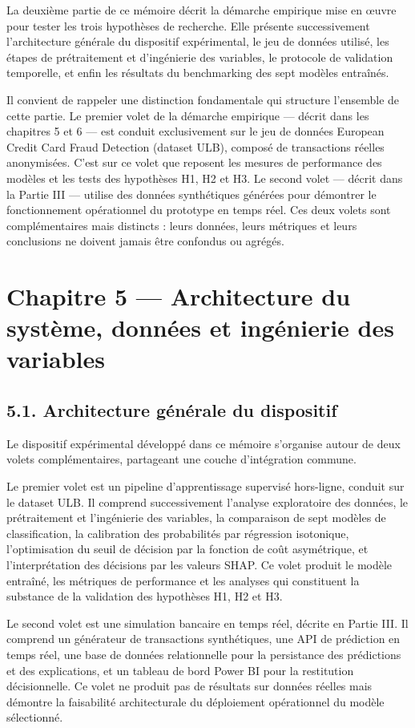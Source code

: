 La deuxième partie de ce mémoire décrit la démarche empirique mise en œuvre pour tester les trois hypothèses de recherche. Elle présente successivement l'architecture générale du dispositif expérimental, le jeu de données utilisé, les étapes de prétraitement et d'ingénierie des variables, le protocole de validation temporelle, et enfin les résultats du benchmarking des sept modèles entraînés.

Il convient de rappeler une distinction fondamentale qui structure l'ensemble de cette partie. Le premier volet de la démarche empirique — décrit dans les chapitres 5 et 6 — est conduit exclusivement sur le jeu de données European Credit Card Fraud Detection (dataset ULB), composé de transactions réelles anonymisées. C'est sur ce volet que reposent les mesures de performance des modèles et les tests des hypothèses H1, H2 et H3. Le second volet — décrit dans la Partie III — utilise des données synthétiques générées pour démontrer le fonctionnement opérationnel du prototype en temps réel. Ces deux volets sont complémentaires mais distincts : leurs données, leurs métriques et leurs conclusions ne doivent jamais être confondus ou agrégés.

\chapter{Chapitre 5 — Architecture du système, données et ingénierie des variables}

\section{5.1. Architecture générale du dispositif}

Le dispositif expérimental développé dans ce mémoire s'organise autour de deux volets complémentaires, partageant une couche d'intégration commune.

Le premier volet est un pipeline d'apprentissage supervisé hors-ligne, conduit sur le dataset ULB. Il comprend successivement l'analyse exploratoire des données, le prétraitement et l'ingénierie des variables, la comparaison de sept modèles de classification, la calibration des probabilités par régression isotonique, l'optimisation du seuil de décision par la fonction de coût asymétrique, et l'interprétation des décisions par les valeurs SHAP. Ce volet produit le modèle entraîné, les métriques de performance et les analyses qui constituent la substance de la validation des hypothèses H1, H2 et H3.

Le second volet est une simulation bancaire en temps réel, décrite en Partie III. Il comprend un générateur de transactions synthétiques, une API de prédiction en temps réel, une base de données relationnelle pour la persistance des prédictions et des explications, et un tableau de bord Power BI pour la restitution décisionnelle. Ce volet ne produit pas de résultats sur données réelles mais démontre la faisabilité architecturale du déploiement opérationnel du modèle sélectionné.

